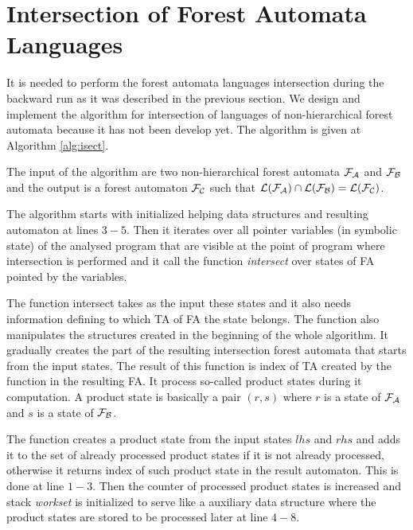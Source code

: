 \section{Intersection of Forest Automata Languages}
\label{sec:isect}
It is needed to perform the forest automata languages intersection
during the backward run as it was described in the previous section.
We design and implement the algorithm for intersection
of languages of non-hierarchical forest automata because it has not been develop yet.
The algorithm is given at Algorithm \ref{alg:isect}.

The input of the algorithm are two non-hierarchical forest automata $\mathcal{F}_{\mathcal{A}}$
and $\mathcal{F}_{\mathcal{B}}$ and the output is a forest automaton $\mathcal{F}_{\mathcal{C}}$ such that
$\mathcal{L}(\mathcal{F}_{\mathcal{A}}) \cap \mathcal{L}(\mathcal{F}_{\mathcal{B}}) = \mathcal{L}(\mathcal{F}_{\mathcal{C}})$.

The algorithm starts with initialized helping data structures and
resulting automaton at lines $3-5$.
Then it iterates over all pointer variables (in symbolic state) of the analysed program
that are visible at the point of program where intersection is performed
and it call the function \emph{intersect} over states of FA pointed
by the variables.

The function intersect takes as the input these states and
it also needs information defining to which TA of FA the state belongs.
The function also manipulates the structures created in the beginning of the
whole algorithm.
It gradually creates the part of the resulting intersection forest automata that starts
from the input states.
The result of this function is index of TA created by the function in the resulting FA.
It process so-called product states during it computation.
A product state is basically a pair $(r,s)$ where $r$ is a state of $\mathcal{F}_{\mathcal{A}}$
and $s$ is a state of $\mathcal{F}_{\mathcal{B}}$.

The function creates a product state from the input states $lhs$ and $rhs$ and
adds it to the set of already processed product states if it is not already processed,
otherwise it returns index of such product state in the result automaton.
This is done at line $1-3$.
Then the counter of processed product states is increased and
stack \emph{workset} is initialized to serve like a auxiliary data
structure where the product states are stored to be processed later at line $4-8$.

